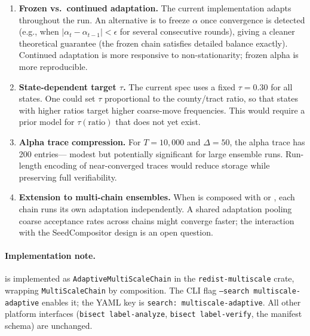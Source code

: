 \begin{enumerate}
  \item \textbf{Frozen vs.\ continued adaptation.}
    The current implementation adapts throughout the run.
    An alternative is to freeze $\alpha$ once convergence is detected
    (e.g., when $|\alpha_t - \alpha_{t-1}| < \epsilon$ for several consecutive
    rounds), giving a cleaner theoretical guarantee (the frozen chain
    satisfies detailed balance exactly).
    Continued adaptation is more responsive to non-stationarity; frozen
    alpha is more reproducible.

  \item \textbf{State-dependent target $\tau$.}
    The current spec uses a fixed $\tau = 0.30$ for all states.
    One could set $\tau$ proportional to the county/tract ratio, so that
    states with higher ratios target higher coarse-move frequencies.
    This would require a prior model for $\tau(\text{ratio})$ that does not
    yet exist.

  \item \textbf{Alpha trace compression.}
    For $T = 10{,}000$ and $\Delta = 50$, the alpha trace has 200 entries---
    modest but potentially significant for large ensemble runs.
    Run-length encoding of near-converged traces would reduce storage while
    preserving full verifiability.

  \item \textbf{Extension to multi-chain ensembles.}
    When \ams{} is composed with \cs{} or \be{}, each chain runs its own
    adaptation independently.
    A shared adaptation pooling coarse acceptance rates across chains might
    converge faster; the interaction with the SeedCompositor design is an
    open question.
\end{enumerate}

\paragraph{Implementation note.}
\ams{} is implemented as \texttt{AdaptiveMultiScaleChain} in the
\texttt{redist-multiscale} crate, wrapping \texttt{MultiScaleChain} by
composition.
The CLI flag \texttt{--search multiscale-adaptive} enables it; the YAML
key is \texttt{search: multiscale-adaptive}.
All other platform interfaces (\texttt{bisect label-analyze},
\texttt{bisect label-verify}, the manifest schema) are unchanged.
